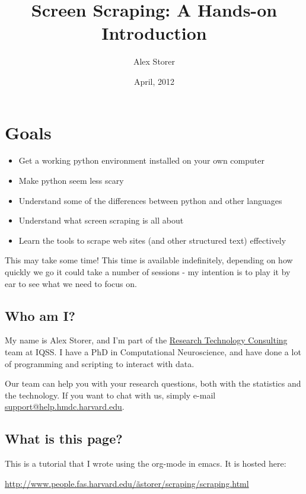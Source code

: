 \documentclass[11pt]{article}
\title{Screen Scraping: A Hands-on Introduction}
\author{Alex Storer}
\date{April, 2012}
\begin{document}
\maketitle

\setcounter{tocdepth}{3}
\tableofcontents
\vspace*{1cm}




\section{Goals}
\label{sec-1}

\begin{itemize}
\item Get a working python environment installed on your own computer
\item Make python seem less scary
\item Understand some of the differences between python and other languages
\item Understand what screen scraping is all about
\item Learn the tools to scrape web sites (and other structured text)
  effectively
\end{itemize}

This may take some time!  This time is available indefinitely,
depending on how quickly we go it could take a number of sessions -
my intention is to play it by ear to see what we need to focus on.
\subsection{Who am I?}
\label{sec-1-1}


My name is Alex Storer, and I'm part of the \href{http://rtc.iq.harvard.edu}{Research Technology Consulting} team at IQSS.  I have a PhD in Computational Neuroscience,
and have done a lot of programming and scripting to interact with
data.

Our team can help you with your research questions, both with the
statistics and the technology.  If you want to chat with us, simply
e-mail \hyperref[support-help.hmdc.harvard.edu]{support@help.hmdc.harvard.edu}.
\subsection{What is this page?}
\label{sec-1-2}


This is a tutorial that I wrote using the org-mode in emacs.  It is
hosted here:

\href{http://www.people.fas.harvard.edu/~astorer/scraping/scraping.html}{http://www.people.fas.harvard.edu/\~astorer/scraping/scraping.html}
\end{document}
